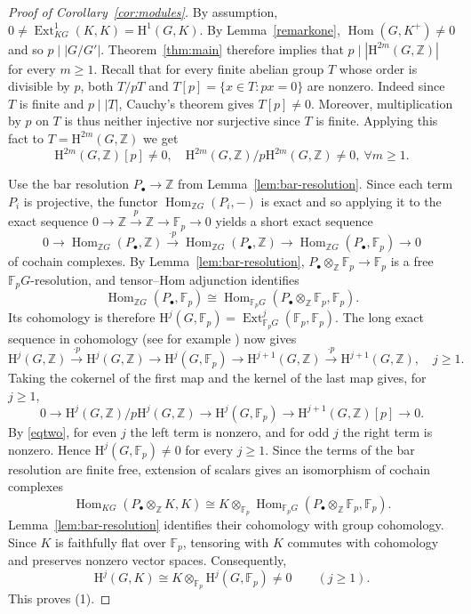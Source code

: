 \documentclass[11pt,a4paper]{amsart}
\numberwithin{equation}{section}
\DeclareMathOperator{\Ext}{Ext}
\DeclareMathOperator{\Hom}{Hom}
\newcommand{\HH}{\mathrm H}
\newcommand{\Z}{\mathbb Z}
\newcommand{\Fp}{\mathbb F_p}
\begin{document}
\begin{proof}[Proof of Corollary~\ref{cor:modules}]
By assumption, $0\neq \Ext_{KG}^1(K, K)=\HH^1(G, K)$. By Lemma~\ref{remarkone}, $\Hom(G, K^+)\neq 0$ and so $p\mid |G/G'|$.
Theorem~\ref{thm:main} therefore implies that
$p\mid|\HH^{2m}(G,\Z)|$ for every $m\geq1$.
Recall that for every finite abelian group $T$ whose order is divisible by $p$,
both $T/pT$ and $T[p]=\{x\in T:px=0\}$ are nonzero. Indeed since $T$ is finite and $p\mid |T|$, Cauchy's theorem gives $T[p]\neq 0$. Moreover, multiplication by $p$ on $T$ is thus neither injective nor surjective since $T$ is finite. Applying this fact to $T=\HH^{2m}(G,\Z)$ we get
\begin{equation}
    \HH^{2m}(G,\Z)[p]\neq 0, \quad \HH^{2m}(G,\Z)/p\HH^{2m}(G,\Z)\neq 0, \ \forall m\geq 1. \label{eqtwo}
\end{equation}

Use the bar resolution $P_\bullet\to\Z$ from
Lemma~\ref{lem:bar-resolution}. Since each term $P_i$ is projective, the functor $\Hom_{\Z G}(P_i, -)$ is exact and so applying it to the exact sequence
$0\to\Z\xrightarrow{p}\Z\to\Fp\to0$ yields a short exact sequence
\[0\rightarrow \Hom_{\Z G}(P_\bullet, \Z)\xrightarrow{\cdot p} \Hom_{\Z G}(P_\bullet, \Z) \rightarrow \Hom_{\Z G}(P_\bullet, \Fp)\rightarrow 0 \]
of cochain complexes. By Lemma~\ref{lem:bar-resolution},
$P_\bullet\otimes_\Z\Fp\to\Fp$ is a free $\Fp G$-resolution,
and tensor--Hom adjunction identifies
\[
 \Hom_{\Z G}(P_\bullet,\Fp)
 \cong\Hom_{\Fp G}(P_\bullet\otimes_\Z\Fp,\Fp).
\]
Its cohomology is therefore
$\HH^j(G,\Fp)=\Ext^j_{\Fp G}(\Fp,\Fp)$.
The long exact sequence in cohomology (see for example \cite[Proposition~2.5.3(ii), p.~36]{Ben})
now gives
\[
 \HH^j(G,\Z)\xrightarrow{\cdot p}\HH^j(G,\Z)
 \longrightarrow\HH^j(G,\Fp)
 \longrightarrow\HH^{j+1}(G,\Z)
 \xrightarrow{\cdot p}\HH^{j+1}(G,\Z), \quad j\geq 1.
\]
Taking the cokernel of the first
map and the kernel of the last map gives, for $j\geq1$,
\begin{equation}\label{eq:arithmetic-modp}
 0\longrightarrow\HH^j(G,\Z)/p\HH^j(G,\Z)
 \longrightarrow\HH^j(G,\Fp)
 \longrightarrow\HH^{j+1}(G,\Z)[p]\longrightarrow0.
\end{equation}
By \eqref{eqtwo}, for even $j$ the left term is nonzero, and for odd $j$ the right
term is nonzero. Hence $\HH^j(G,\Fp)\neq0$ for every $j\geq1$.
Since the terms of the bar resolution are finite free, extension
of scalars gives an isomorphism of cochain complexes
\[
 \Hom_{KG}(P_\bullet\otimes_\Z K,K)
 \cong K\otimes_{\Fp}
       \Hom_{\Fp G}(P_\bullet\otimes_\Z\Fp,\Fp).
\]
Lemma~\ref{lem:bar-resolution} identifies their cohomology with
group cohomology. Since $K$ is faithfully flat over $\Fp$,
tensoring with $K$ commutes with cohomology and preserves
nonzero vector spaces. Consequently,
\[
 \HH^j(G,K)\cong K\otimes_{\Fp}\HH^j(G,\Fp)\neq0
 \qquad(j\geq1).
\]
This proves (1).



\end{proof}
\end{document}

